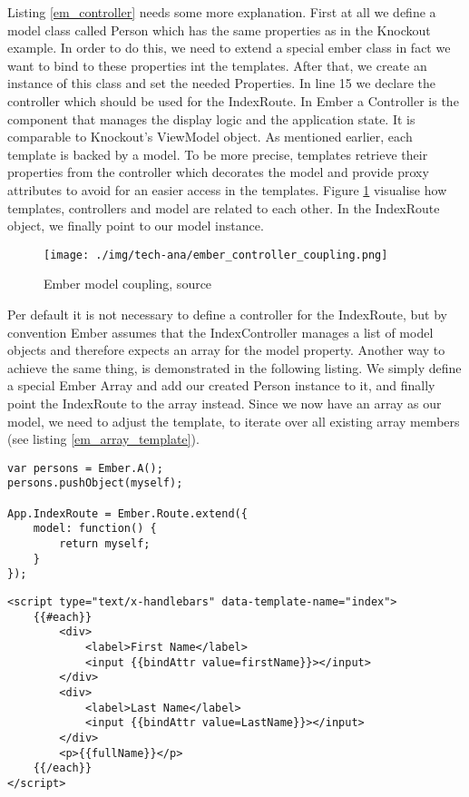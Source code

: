 Listing \ref{em_controller} needs some more explanation.
First at all we define a model class called Person which has the same properties as in the Knockout example.
In order to do this, we need to extend a special ember class in fact we want to bind to these properties int the templates.
After that, we create an instance of this class and set the needed Properties.
In line 15 we declare the controller which should be used for the IndexRoute.
In Ember a Controller is the component that manages the display logic and the application state.
It is comparable to Knockout's ViewModel object.
As mentioned earlier, each template is backed by a model.
To be more precise, templates retrieve their properties from the controller which decorates the model and provide proxy attributes to avoid for an easier access in the templates. Figure \ref{fig:ember_coupling} visualise how templates, controllers and model are related to each other.
In the IndexRoute object, we finally point to our model instance.

\begin{figure}
	\centering	\texttt{[image: ./img/tech-ana/ember\_controller\_coupling.png]}
	\caption{Ember model coupling, source \autocite{tech-ana:em-coupling}}
	\label{fig:ember_coupling}
\end{figure} 
 

Per default it is not necessary to define a controller for the IndexRoute, but by convention Ember assumes that the IndexController manages a list of model objects and therefore expects an array for the model property.
Another way to achieve the same thing, is demonstrated in the following listing.
We simply define a special Ember Array and add our created Person instance to it, and finally point the IndexRoute to the array instead.
Since we now have an array as our model, we need to adjust the template, to iterate over all existing array members (see listing \ref{em_array_template}).

\begin{lstlisting}[caption=app.js]
var persons = Ember.A();
persons.pushObject(myself);

App.IndexRoute = Ember.Route.extend({
    model: function() {
        return myself;
    }
});

\end{lstlisting}     

\begin{lstlisting}[label=em_array_template,caption=index.html]
<script type="text/x-handlebars" data-template-name="index">
	{{#each}}
		<div>
			<label>First Name</label> 
			<input {{bindAttr value=firstName}}></input>
		</div>
		<div>
			<label>Last Name</label> 
			<input {{bindAttr value=LastName}}></input>
		</div>
		<p>{{fullName}}</p>
	{{/each}}
</script>
\end{lstlisting}

